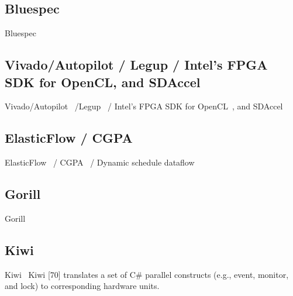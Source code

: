 \subsection{Bluespec}
Bluespec~\cite{bluespec}
%

\subsection{Vivado/Autopilot / Legup / Intel's FPGA SDK for OpenCL, and SDAccel}

Vivado/Autopilot~\cite{vivado,vivadohls,autopilot} /Legup~\cite{canis_2011_legup} / Intel's FPGA SDK for OpenCL~\cite{opencl_sdk}, and SDAccel~\cite{sdaccel}
%

\subsection{ElasticFlow / CGPA}

ElasticFlow~\cite{elasticFlow} / CGPA~\cite{cgpa} / Dynamic schedule dataflow~\cite{josipovic_fpga_2018_dynamically}
%

\subsection{Gorill}
Gorill~\cite{lavasani_thesis}

\subsection{Kiwi}
Kiwi~\cite{kiwi}
Kiwi [70] translates a set of C# parallel constructs (e.g., event, monitor,
and lock) to corresponding hardware units.

